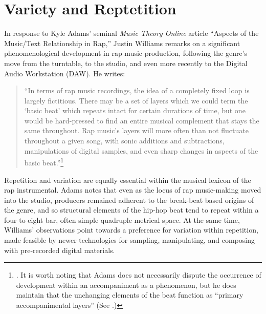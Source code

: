 \onehalfspacing 
\label{chapter2}
\section{Variety and Reptetition}
In response to Kyle Adams' seminal \textit{Music Theory Online} article ``Aspects of the Music/Text
Relationship in Rap,'' Justin Williams remarks on a significant phenomenological development in rap 
music production, following the genre's move from the turntable, to the studio, and even more recently
to the Digital Audio Workstation (DAW). He writes:

\begin{quote}
    \small ``In terms of rap music recordings, the idea of a completely fixed loop is largely fictitious.
    There may be a set of layers which we could term the `basic beat' which repeats intact for certain
    durations of time, but one would be hard-pressed to find an entire musical complement that stays the 
    same throughout. Rap music’s layers will more often than not fluctuate throughout a given song, with
    sonic additions and subtractions, manipulations of digital samples, and even sharp changes in aspects 
    of the basic beat.''\footnote{\cite{justinawilliamsBeatsFlowsResponse2009}. It is worth noting that 
    Adams does not necessarily dispute the occurrence of development within an accompaniment as a phenomenon,
    but he does maintain that the unchanging elements of the beat function as ``primary accompanimental
    layers'' (See \cite{kyleadamsPeopleInstinctiveAssumptions2009}.)}
\end{quote}

\noindent \normalsize Repetition and variation are equally essential within the musical lexicon of 
the rap instrumental. Adams notes that even as the locus of rap music-making moved into the studio, 
producers remained adherent to the break-beat based origins of the genre, and so structural elements of 
the hip-hop beat tend to repeat within a four to eight bar, often simple quadruple metrical space. At the
same time, Williams' observations point towards a preference for variation within repetition, made 
feasible by newer technologies for sampling, manipulating, and composing with pre-recorded digital 
materials.

